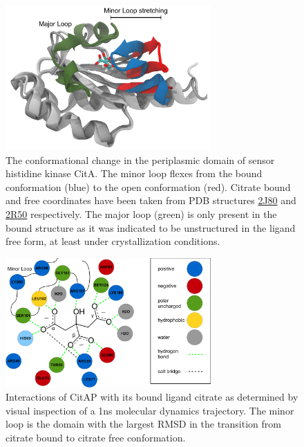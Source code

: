 \documentclass[english, a4paper, 12pt, titlepage, draft]{article}
\newcommand{\PDB}[1]{
    \href{http://pdb.rcsb.org/pdb/explore/explore.do?structureId=#1}{#1}
}
\begin{document}
\begin{figure}
    \centering
    \includegraphics[width=0.7\textwidth]{figures/CitAP_conf_change/CitAP_conf_change.pdf}
    \caption{The conformational change in the periplasmic domain of sensor histidine kinase CitA.
    The minor loop flexes from the bound conformation (blue) to the open conformation (red).
    Citrate bound and free coordinates have been taken from PDB structures \PDB{2J80} and \PDB{2R50} respectively.
    The major loop (green) is only present in the bound structure as it was indicated to be unstructured in the ligand free form, at least under crystallization conditions.}
    \label{fig:CitA_opening}
\end{figure}     



\begin{figure}
    \centering
    \includegraphics[width=0.7\textwidth]{figures/citrate_interactions/citrate_interactions.pdf}
    \caption{Interactions of CitAP with its bound ligand citrate as determined by visual inspection of a 1ns molecular dynamics trajectory. The minor loop is the domain with the largest RMSD in the transition from citrate bound to citrate free conformation.}
    \label{fig:citrate_interactions}
\end{figure}      


\end{document}
